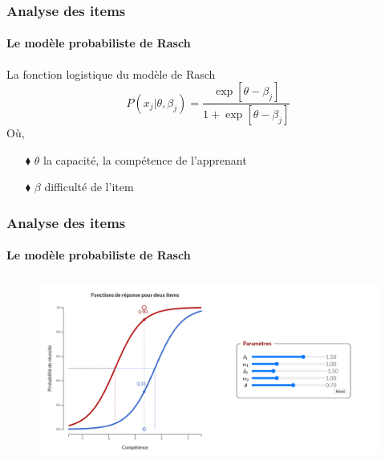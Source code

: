 \documentclass[aspectratio=169,professionalfonts, 12pt]{beamer}
\begin{document}

\begin{frame}
  \frametitle{Analyse des items}
  \framesubtitle{Le modèle probabiliste de Rasch}
  \justifying 
  \begin{minipage}{\textwidth}
  \begin{block}{La fonction logistique du modèle de Rasch}
  \begin{equation}P(x_{j}| \theta, \beta_{j}) = \frac{\exp \left[\theta - \beta_{j} \right]  }{1+ \exp \left[ \theta - \beta_{j} \right] }
  \end{equation}
  Où, \\
  \begin{itemize}
    \item[$\blacklozenge$] \(\displaystyle \theta \) la capacité, la compétence de l'apprenant 
    \item[$\blacklozenge$] \(\displaystyle \beta \) difficulté de l'item
  \end{itemize}
  \end{block}  
  \end{minipage} 
\end{frame}

\begin{frame}
  \frametitle{Analyse des items}
  \framesubtitle{Le modèle probabiliste de Rasch}
  \justifying 
  \begin{minipage}{\textwidth}
  \begin{figure}[H]
      \includegraphics[height=6cm]{images/etat_art/rasch_figure.png}
  \end{figure}
  \end{minipage}
\end{frame}
\end{document}
